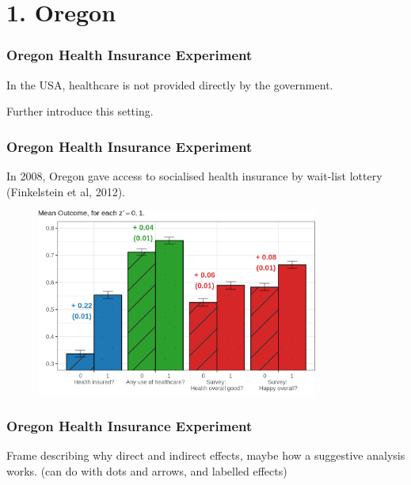 \documentclass[dvipsnames,handout]{beamer} %
\begin{document}
\section{1. Oregon}
\begin{frame}
    \frametitle{Oregon Health Insurance Experiment}
    In the USA, healthcare is not provided directly by the government. 

    \vfill
    Further introduce this setting.
\end{frame}
\begin{frame}
    \frametitle{Oregon Health Insurance Experiment}
    In 2008, Oregon gave access to socialised health insurance by wait-list lottery (Finkelstein et al, 2012).

    \vskip-0.25cm
    \begin{figure}
        \centering
        \singlespacing
        \includegraphics[width=0.825\textwidth]{
            ../text/sections/figures/insurance-effects.png}
    \end{figure}
\end{frame}
\begin{frame}
    \frametitle{Oregon Health Insurance Experiment}
    Frame describing why direct and indirect effects, maybe how a suggestive analysis works. (can do with dots and arrows, and labelled effects)
\end{frame}
\end{document}

